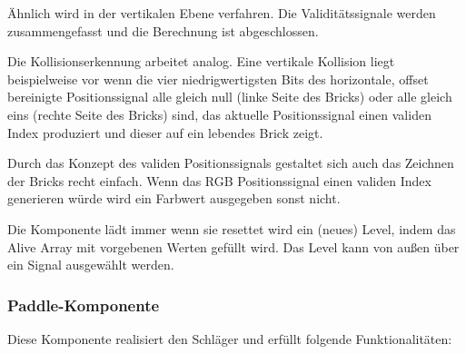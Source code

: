 \documentclass{scrartcl}
\begin{document}
Ähnlich wird in der vertikalen Ebene verfahren. Die Validitätssignale werden
zusammengefasst und die Berechnung ist abgeschlossen.

Die Kollisionserkennung arbeitet analog. Eine vertikale Kollision liegt
beispielweise vor wenn die vier niedrigwertigsten Bits des horizontale, offset
bereinigte Positionssignal alle gleich null (linke Seite des Bricks) oder
alle gleich eins (rechte Seite des Bricks) sind, das aktuelle Positionssignal
einen validen Index produziert und dieser auf ein lebendes Brick zeigt.

Durch das Konzept des validen Positionssignals gestaltet sich auch das Zeichnen
der Bricks recht einfach. Wenn das RGB Positionssignal einen validen Index
generieren würde wird ein Farbwert ausgegeben sonst nicht.

Die Komponente lädt immer wenn sie resettet wird ein (neues) Level, indem das
Alive Array mit vorgebenen Werten gefüllt wird.
Das Level kann von außen über ein Signal ausgewählt werden.

\subsubsection{Paddle-Komponente}
Diese Komponente realisiert den Schläger und erfüllt folgende Funktionalitäten:
\end{document}
